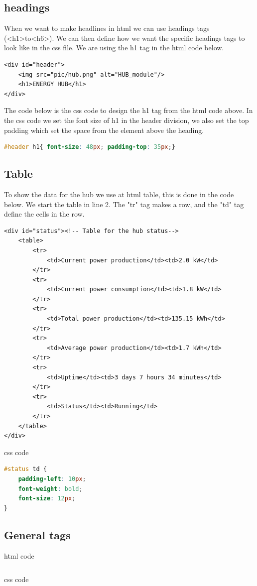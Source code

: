 \subsection{headings}
When we want to make headlines in html we can use headings tags (\textless h1\textgreater  to\textless h6\textgreater). We can then define how we want the specific headings tags to look like in the css file. We are using the h1 tag in the html code below.
\begin{lstlisting}
<div id="header">
	<img src="pic/hub.png" alt="HUB_module"/>
	<h1>ENERGY HUB</h1>
</div>
\end{lstlisting}
The code below is the css code to design the h1 tag from the html code above. In the css code we set the font size of h1 in the header division, we also set the top padding which set the space from the element above the heading.
\begin{lstlisting}[language=CSS]
#header h1{ font-size: 48px; padding-top: 35px;}
\end{lstlisting}

\subsection{Table}
To show the data for the hub we use at html table, this is done in the code below. We start the table in line 2. The "tr" tag makes a row, and the "td" tag define the cells in the row. 
\begin{lstlisting}
<div id="status"><!-- Table for the hub status-->
	<table>
		<tr>
			<td>Current power production</td><td>2.0 kW</td>
		</tr>
		<tr>
			<td>Current power consumption</td><td>1.8 kW</td>
		</tr>
		<tr>
			<td>Total power production</td><td>135.15 kWh</td>
		</tr>
		<tr>
			<td>Average power production</td><td>1.7 kWh</td>
		</tr>
		<tr>
			<td>Uptime</td><td>3 days 7 hours 34 minutes</td>
		</tr>
		<tr>
			<td>Status</td><td>Running</td>
		</tr>
	</table>
</div>
\end{lstlisting}
css code
\begin{lstlisting}[language=CSS]
#status td {
	padding-left: 10px;
	font-weight: bold;
	font-size: 12px;
}
\end{lstlisting}

\subsection{General tags}
html code
\begin{lstlisting}

\end{lstlisting}
css code
\begin{lstlisting}[language=CSS]

\end{lstlisting}